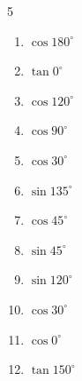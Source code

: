 \begin{multicols}{5}
\begin{enumerate}
        \phantom{$\displaystyle =0$}

  \item $\displaystyle \cos{180^\circ}$

        \phantom{$\displaystyle =-1$}

  \item $\displaystyle \tan{0^\circ}$

        \phantom{$\displaystyle =0$}

  \item $\displaystyle \cos{120^\circ}$


  \item $\displaystyle \cos{90^\circ}$

        \phantom{$\displaystyle =0$}

  \item $\displaystyle \cos{30^\circ}$


  \item $\displaystyle \sin{135^\circ}$


  \item $\displaystyle \cos{45^\circ}$


\columnbreak %

  \item $\displaystyle \sin{45^\circ}$


  \item $\displaystyle \sin{120^\circ}$


  \item $\displaystyle \cos{30^\circ}$


  \item $\displaystyle \cos{0^\circ}$

        \phantom{$\displaystyle =1$}

  \item $\displaystyle \tan{150^\circ}$



\end{enumerate}
\end{multicols}
